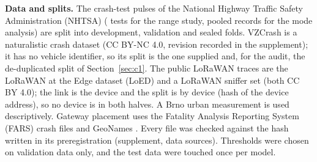 \documentclass{ieeeaccess}
\begin{document}
\textbf{Data and splits.} The crash-test pulses of the National Highway Traffic Safety Administration (NHTSA) \cite{nhtsa} (\SevTests{} tests for the range study, \PoolN{} pooled records for the mode analysis) are split into development, validation and sealed folds. VZCrash \cite{vzcrash} is a naturalistic crash dataset (CC BY-NC 4.0, revision recorded in the supplement); it has no vehicle identifier, so its split is the one supplied and, for the audit, the de-duplicated split of Section~\ref{sec:c1}. The public LoRaWAN traces are the LoRaWAN at the Edge dataset (LoED) \cite{loed,loed_data20} and a LoRaWAN sniffer set \cite{sniffer} (both CC BY 4.0); the link is the device and the split is by device (hash of the device address), so no device is in both halves. A Brno urban measurement \cite{brno} is used descriptively. Gateway placement uses the Fatality Analysis Reporting System (FARS) crash files \cite{fars} and GeoNames \cite{geonames}. Every file was checked against the hash written in its preregistration (supplement, data sources). Thresholds were chosen on validation data only, and the test data were touched once per model.
\end{document}
